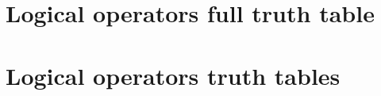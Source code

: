 
\section*{Logical operators full truth table}

\vfill
\section*{Logical operators truth tables}

\vfill
